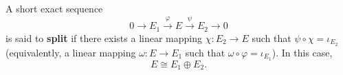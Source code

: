 A short exact sequence
$$0 \longrightarrow E_1 \xrightarrow{\varphi} E \xrightarrow{\psi} E_2 \longrightarrow 0$$
is said to \textbf{split} if there exists a linear mapping $\chi: E_2 \to E$ such that $\psi \circ \chi = \iota_{E_2}$ (equivalently, a linear mapping $\omega: E \to E_1$ such that $\omega \circ \varphi = \iota_{E_1}$). In this case,
$$E \cong E_1 \oplus E_2.$$
